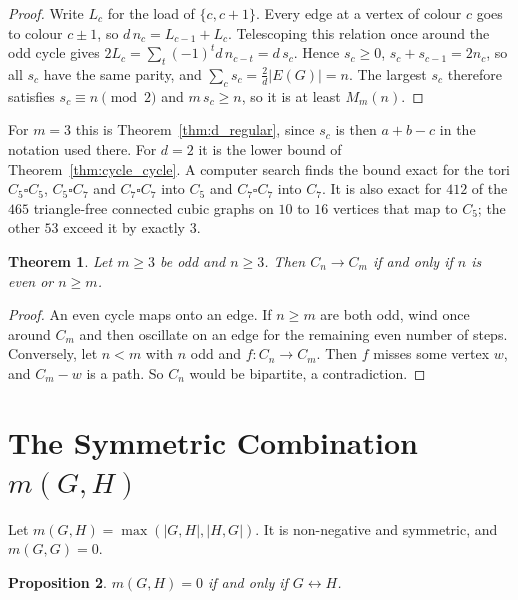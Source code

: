 \documentclass{article}
\newtheorem{theorem}{Theorem}[section]
\newtheorem{proposition}[theorem]{Proposition}
\theoremstyle{definition}
\begin{document}
\begin{proof}
Write $L_c$ for the load of $\{c,c+1\}$.  Every edge at a vertex of colour $c$
goes to colour $c\pm1$, so $d\,n_c=L_{c-1}+L_c$.  Telescoping this relation
once around the odd cycle gives $2L_c=\sum_t(-1)^t d\,n_{c-t}=d\,s_c$.  Hence
$s_c\ge0$, $s_c+s_{c-1}=2n_c$, so all $s_c$ have the same parity, and
$\sum_cs_c=\frac2d|E(G)|=n$.  The largest $s_c$ therefore satisfies
$s_c\equiv n\pmod 2$ and $m\,s_c\ge n$, so it is at least $M_m(n)$.
\end{proof}

For $m=3$ this is Theorem~\ref{thm:d_regular}, since $s_c$ is then
$a+b-c$ in the notation used there.  For $d=2$ it is the lower bound of
Theorem~\ref{thm:cycle_cycle}.  A computer search finds the bound exact for the
tori $C_5\square C_5$, $C_5\square C_7$ and $C_7\square C_7$ into $C_5$ and
$C_7\square C_7$ into $C_7$.  It is also exact for $412$ of the $465$ triangle-free
connected cubic graphs on $10$ to $16$ vertices that map to $C_5$; the other $53$ exceed it
by exactly $3$.

\begin{theorem}
\label{thm:cycle_hom}
Let $m\ge3$ be odd and $n\ge3$.  Then $C_n\to C_m$ if and only if $n$ is even or
$n\ge m$.
\end{theorem}

\begin{proof}
An even cycle maps onto an edge.  If $n\ge m$ are both odd, wind once around
$C_m$ and then oscillate on an edge for the remaining even number of steps.
Conversely, let $n<m$ with $n$ odd and $f\colon C_n\to C_m$.  Then $f$ misses some
vertex $w$, and $C_m-w$ is a path.  So $C_n$ would be bipartite, a contradiction.
\end{proof}



\section{The Symmetric Combination $m(G,H)$}
\label{sec:metric}

Let $m(G,H)=\max(|G,H|,|H,G|)$.  It is non-negative and symmetric, and
$m(G,G)=0$.

\begin{proposition}
\label{prop:m_zero}
$m(G,H)=0$ if and only if $G\leftrightarrow H$.
\end{proposition}
\end{document}
